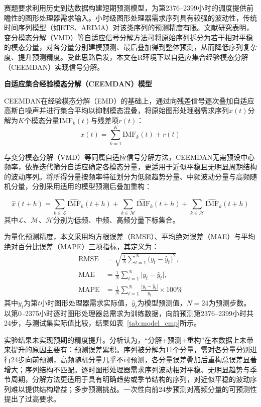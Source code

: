 \documentclass{ctexart}
\begin{document}
赛题要求利用历史到达数据构建短期预测模型，为第2376–2399小时的调度提供前瞻性的图形处理器需求输入。小时级图形处理器需求序列具有较强的波动性，传统时间序列模型（如ETS、ARIMA）对该类序列的预测精度有限。文献研究表明，变分模态分解（VMD）等自适应信号分解方法可将原始序列拆分为若干相对平稳的模态分量，对各分量分别建模预测、最后叠加得到整体预测，从而降低序列复杂度、提升预测精度\cite{zhangxing2026,huhong2026}。受此思路启发，本文在R环境下以自适应集合经验模态分解（CEEMDAN）实现信号分解。

\textbf{自适应集合经验模态分解（CEEMDAN）模型}

CEEMDAN在经验模态分解（EMD）的基础上，通过向残差信号逐次叠加自适应高斯白噪声并进行集合平均以抑制模态混叠，将原始图形处理器需求序列$x(t)$分解为$K$个模态分量$\mathrm{IMF}_k(t)$与残差项$r(t)$：
\begin{equation}
	x(t)=\sum_{k=1}^{K}\mathrm{IMF}_k(t)+r(t)
\end{equation}

与变分模态分解（VMD）等同属自适应信号分解方法，CEEMDAN无需预设中心频率，依靠迭代筛分自适应确定各模态分量，更适用于近似平稳且无明显周期结构的波动序列。将所得分量按频率特征划分为低频趋势分量、中频波动分量与高频随机分量，分别采用适用的模型预测后叠加重构：

\begin{equation}
\hat{x}(t+h)=\sum_{k\in\mathcal{L}}\widehat{\mathrm{IMF}}_k(t+h)+\sum_{k\in\mathcal{M}}\widehat{\mathrm{IMF}}_k(t+h)+\sum_{k\in\mathcal{H}}\widehat{\mathrm{IMF}}_k(t+h)
\end{equation}
其中$\mathcal{L}$、$\mathcal{M}$、$\mathcal{H}$分别为低频、中频、高频分量下标集合。

为量化预测精度，本文采用均方根误差（RMSE）、平均绝对误差（MAE）与平均绝对百分比误差（MAPE）三项指标，其定义为：
\begin{align}
\mathrm{RMSE}&=\sqrt{\frac{1}{N}\sum_{t=1}^{N}\big(y_t-\hat y_t\big)^2},\\
\mathrm{MAE}&=\frac{1}{N}\sum_{t=1}^{N}\big|y_t-\hat y_t\big|,\\
\mathrm{MAPE}&=\frac{1}{N}\sum_{t=1}^{N}\frac{\big|y_t-\hat y_t\big|}{y_t}\times100\%
\end{align}
其中$y_t$为第$t$小时图形处理器需求实际值，$\hat y_t$为模型预测值，$N=24$为预测步数。以第0--2375小时逐时图形处理器总需求为训练数据，向前预测第2376--2399小时共24步，与测试集实际值比较，结果如表~\ref{tab:model_cmp}所示。

实验结果未实现预期的精度提升。分析认为，“分解+预测+重构”在本数据上未带来提升的原因主要有：预测误差累积。序列被分解为11个分量，需对各分量分别进行24步向前预测，高频随机分量几乎不可预测，各分量误差叠加后重构总误差显著增大；序列结构不匹配。逐时图形处理器需求序列波动相对平稳、无明显趋势与季节周期，分解方法更适用于具有明确趋势或季节结构的序列，对近似平稳的波动序列难以提供结构增益；多步预测挑战。一次性向前24步预测对高频分量的可预测性提出了过高要求。
\end{document}

